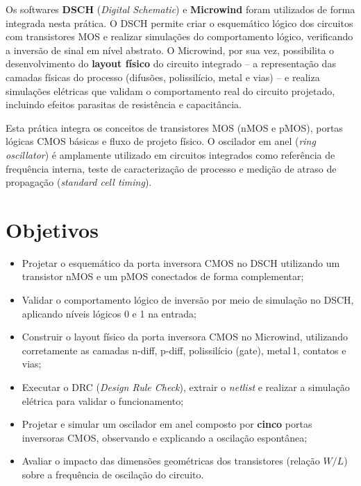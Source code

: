 \documentclass[12pt,a4paper]{article}
\begin{document}
Os softwares \textbf{DSCH} (\textit{Digital Schematic}) e \textbf{Microwind} foram
utilizados de forma integrada nesta prática. O DSCH permite criar o esquemático
lógico dos circuitos com transistores MOS e realizar simulações do comportamento
lógico, verificando a inversão de sinal em nível abstrato. O Microwind, por sua vez,
possibilita o desenvolvimento do \textbf{layout físico} do circuito integrado -- a
representação das camadas físicas do processo (difusões, polissilício, metal e vias)
-- e realiza simulações elétricas que validam o comportamento real do circuito
projetado, incluindo efeitos parasitas de resistência e capacitância.

\begin{unidadebox}
  Esta prática integra os conceitos de transistores MOS (nMOS e pMOS), portas
  lógicas CMOS básicas e fluxo de projeto físico. O oscilador em anel
  (\textit{ring oscillator}) é amplamente utilizado em circuitos integrados como
  referência de frequência interna, teste de caracterização de processo e medição
  de atraso de propagação (\textit{standard cell timing}).
\end{unidadebox}

\section{Objetivos}

\begin{itemize}[leftmargin=1.5cm]
  \item Projetar o esquemático da porta inversora CMOS no DSCH utilizando um
        transistor nMOS e um pMOS conectados de forma complementar;
  \item Validar o comportamento lógico de inversão por meio de simulação no DSCH,
        aplicando níveis lógicos 0 e 1 na entrada;
  \item Construir o layout físico da porta inversora CMOS no Microwind, utilizando
        corretamente as camadas n-diff, p-diff, polissilício (gate), metal\,1,
        contatos e vias;
  \item Executar o DRC (\textit{Design Rule Check}), extrair o \textit{netlist} e
        realizar a simulação elétrica para validar o funcionamento;
  \item Projetar e simular um oscilador em anel composto por \textbf{cinco} portas
        inversoras CMOS, observando e explicando a oscilação espontânea;
  \item Avaliar o impacto das dimensões geométricas dos transistores (relação $W/L$)
        sobre a frequência de oscilação do circuito.
\end{itemize}
\end{document}
